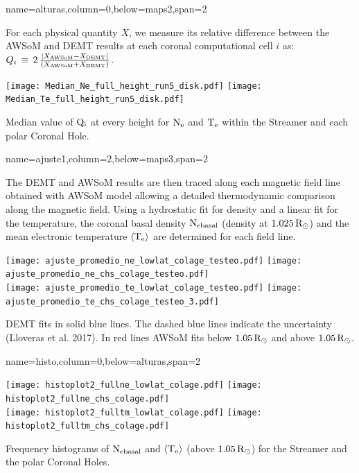 \documentclass[paperwidth=100cm,paperheight=120cm]{baposter_2}
\def\azul#1{\textcolor{blue}{#1}}
\begin{document}
\begin{poster}
{name=alturas,column=0,below=maps2,span=2}{
{\footnotesize\sf
For each physical quantity $X$, we measure its relative difference between the AWSoM and DEMT results at each coronal computational cell $i$ as: 
$Q_i\,\equiv\,2\,\frac{|X_{\rm AWSoM} - X_{\rm DEMT}|}{(X_{\rm AWSoM} + X_{\rm DEMT})}$.
\begin{center}
{\texttt{[image: Median\_Ne\_full\_height\_run5\_disk.pdf]}}
{\texttt{[image: Median\_Te\_full\_height\_run5\_disk.pdf]}}\\
\end{center}
\vskip -0.16cm
Median value of ${\rm Q_i}$ at every height for ${\rm N_e}$ and ${\rm T_e}$ within the Streamer and each polar Coronal Hole.

}
}

{name=ajuste1,column=2,below=maps3,span=2}{
{\footnotesize\sf
The DEMT and AWSoM results are then traced along each magnetic field line obtained with AWSoM model allowing a detailed thermodynamic comparison along the magnetic field. Using a hydrostatic fit for density and a linear fit for the temperature, the coronal basal density ${\rm N_{e basal}}$ (density at $1.025 \, {\rm R}_\odot$) and the mean electronic temperature ${\langle \rm T_e \rangle}$ are determined for each field line.
\begin{center}
{\texttt{[image: ajuste\_promedio\_ne\_lowlat\_colage\_testeo.pdf]}}
{\texttt{[image: ajuste\_promedio\_ne\_chs\_colage\_testeo.pdf]}}\\
{\texttt{[image: ajuste\_promedio\_te\_lowlat\_colage\_testeo.pdf]}}
{\texttt{[image: ajuste\_promedio\_te\_chs\_colage\_testeo\_3.pdf]}}\\
\end{center}
DEMT fits in solid blue lines. The dashed blue lines indicate the uncertainty (Lloveras {\rm et al.} 2017). In red lines AWSoM fits below $1.05 \, {\rm R}_\odot$ and above $1.05 \, {\rm R}_\odot$.

}
}

{name=histo,column=0,below=alturas,span=2}{
{\footnotesize\sf
\begin{center}
{\texttt{[image: histoplot2\_fullne\_lowlat\_colage.pdf]}}
{\texttt{[image: histoplot2\_fullne\_chs\_colage.pdf]}}\\
{\texttt{[image: histoplot2\_fulltm\_lowlat\_colage.pdf]}}
{\texttt{[image: histoplot2\_fulltm\_chs\_colage.pdf]}}\\
\end{center}
\vskip -0.16cm
Frequency histograms of ${\rm N_{e basal}}$ and ${\rm \langle T_e \rangle}$ (above $1.05 \, {\rm R}_\odot$) for the Streamer and the polar Coronal Holes.

}}
\end{poster}
\end{document}
